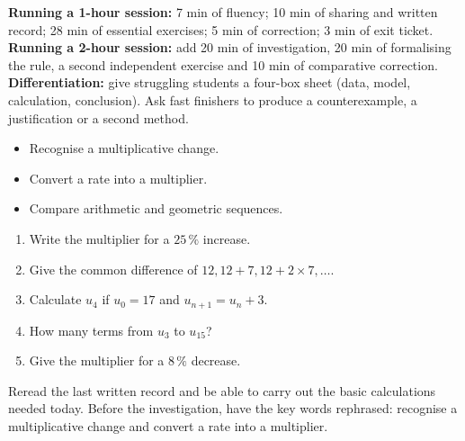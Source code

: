 \ifprof
\begin{methode}
\textbf{Running a 1-hour session:} 7 min of fluency; 10 min of sharing and written record; 28 min of essential exercises; 5 min of correction; 3 min of exit ticket.\\
\textbf{Running a 2-hour session:} add 20 min of investigation, 20 min of formalising the rule, a second independent exercise and 10 min of comparative correction.\\
\textbf{Differentiation:} give struggling students a four-box sheet (data, model, calculation, conclusion). Ask fast finishers to produce a counterexample, a justification or a second method.
\end{methode}
\fi
{}
    \begin{objectifs}\begin{itemize}\item Recognise a multiplicative change.\item Convert a rate into a multiplier.\item Compare arithmetic and geometric sequences.\end{itemize}\end{objectifs}
    \begin{automatismes}\begin{enumerate}\item Write the multiplier for a $25\,\%$ increase. \item Give the common difference of $12,12+7,12+2\times7,\ldots$. \item Calculate $u_4$ if $u_0=17$ and $u_{n+1}=u_n+3$. \item How many terms from $u_3$ to $u_{15}$? \item Give the multiplier for a $8\,\%$ decrease. \end{enumerate}\end{automatismes}
    \begin{prerequis}Reread the last written record and be able to carry out the basic calculations needed today. Before the investigation, have the key words rephrased: recognise a multiplicative change and convert a rate into a multiplier.\end{prerequis}

